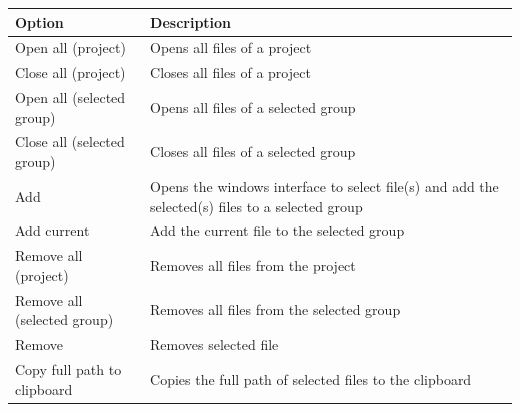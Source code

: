\begin{scriptsize}\begin{tabularx}{\textwidth}{>{\hsize=0.4\hsize}X>{\hsize=0.7\hsize}X}\\
    \hline
    \textbf{Option} & \textbf{Description} \\
    \hline
    Open all (project) & Opens all files of a project \\
    Close all (project) & Closes all files of a project \\
    Open all (selected group) & Opens all files of a selected group \\
    Close all (selected group) & Closes all files of a selected group \\
    Add & Opens the windows interface to select file(s) and add the selected(s) files to a selected group \\
    Add current & Add the current file to the selected group \\
    Remove all (project) & Removes all files from the project \\
    Remove all (selected group) & Removes all files from the selected group \\
    Remove & Removes selected file \\
    Copy full path to clipboard & Copies the full path of selected files to the clipboard \\
    \hline
  \end{tabularx}\end{scriptsize}
